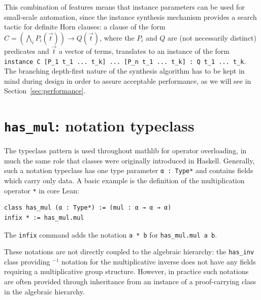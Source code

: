 \documentclass[a4paper,UKenglish,cleveref, autoref, thm-restate]{lipics-v2021}
\newcommand{\mathlib}{\textsf{mathlib}\xspace}
\begin{document}
This combination of features means that instance parameters can be used for small-scale automation,
since the instance synthesis mechanism provides a search tactic for definite Horn clauses:
a clause of the form $C = (\bigwedge_{i} P_i(\vec{t})) \to Q(\vec{t})$, where the $P_i$ and $Q$ are (not necessarily distinct) predicates and $\vec{t}$ a vector of terms,
translates to an instance of the form \lstinline{instance C [P_1 t_1 ... t_k] ... [P_n t_1 ... t_k] : Q t_1 ... t_k}.
The branching depth-first nature of the synthesis algorithm has to be kept in mind during design in order to assure acceptable performance, as we will see in Section~\ref{sec:performance}.

\section{\lstinline{has_mul}: notation typeclass} \label{sec:notation}

The typeclass pattern is used throughout \mathlib for operator overloading,
in much the same role that classes were originally introduced in Haskell.
Generally, such a notation typeclass has one type parameter \lstinline{α : Type*}
and contains fields which carry only data.
A basic example is the definition of the multiplication operator \lstinline{*} in core Lean:
\begin{lstlisting}
class has_mul (α : Type*) := (mul : α → α → α)
infix * := has_mul.mul
\end{lstlisting}
The \lstinline{infix} command adds the notation \mbox{\lstinline{a * b}} for \lstinline{has_mul.mul a b}.

These notations are not directly coupled to the algebraic hierarchy:
the \lstinline{has_inv} class providing ${}^{-1}$ notation for the multiplicative inverse does not have any fields requiring a multiplicative group structure.
However, in practice such notations are often provided through inheritance from an instance of a proof-carrying class in the algebraic hierarchy.
\end{document}
